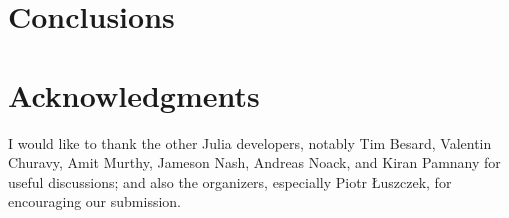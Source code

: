 \documentclass{article}
\begin{document}
\section{Conclusions}

\section*{Acknowledgments}

I would like to thank the other Julia developers, notably Tim Besard, Valentin
Churavy, Amit Murthy, Jameson Nash, Andreas Noack, and Kiran Pamnany for useful
discussions; and also the organizers, especially Piotr \L{}uszczek, for
encouraging our submission.


\end{document}
